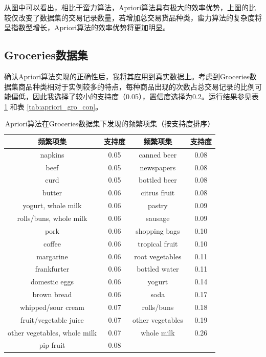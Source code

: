 \documentclass[12pt,a4paper]{article}
\theoremstyle{definition}
\begin{document}
从图中可以看出，相比于蛮力算法，Apriori算法具有极大的效率优势，上图的比较仅改变了数据集的交易记录数量，若增加总交易货品种类，蛮力算法的复杂度将呈指数型增长，Apriori算法的效率优势将更加明显。

\subsection{Groceries数据集}

确认Apriori算法实现的正确性后，我将其应用到真实数据上。考虑到Groceries数据集商品种类相对于实例较多的特点，每种商品出现的次数占总交易记录的比例可能偏低，因此我选择了较小的支持度（0.05），置信度选择为0.2。运行结果参见表 \ref{tab:apriori_gro_sup} 和表 \ref{tab:apriori_gro_con}。

\begin{table}[H]
	\renewcommand\arraystretch{1.35}
	\caption{Apriori算法在Groceries数据集下发现的频繁项集（按支持度排序）}
	\label{tab:apriori_gro_sup}
	\centering
	
	\begin{tabular}{c|c|c|c}
		\centering
		频繁项集 & 支持度 & 频繁项集 & 支持度 \\
		\hline
		napkins & 0.05 & canned beer & 0.08 \\
		beef & 0.05 & newspapers & 0.08 \\
		curd & 0.05 & bottled beer & 0.08 \\
		butter & 0.06 & citrus fruit & 0.08 \\
		yogurt, whole milk & 0.06 & pastry & 0.09 \\
		rolls/buns, whole milk & 0.06 & sausage & 0.09 \\
		pork & 0.06 & shopping bags & 0.10 \\
		coffee & 0.06 & tropical fruit & 0.10 \\
		margarine & 0.06 & root vegetables & 0.11 \\
		frankfurter & 0.06 & bottled water & 0.11 \\
		domestic eggs & 0.06 & yogurt & 0.14 \\
		brown bread & 0.06 & soda & 0.17 \\
		whipped/sour cream & 0.07 & rolls/buns & 0.18 \\
		fruit/vegetable juice & 0.07 & other vegetables & 0.19 \\
		other vegetables, whole milk & 0.07 & whole milk & 0.26 \\
		pip fruit & 0.08 & &
	\end{tabular}
\end{table}
\end{document}
